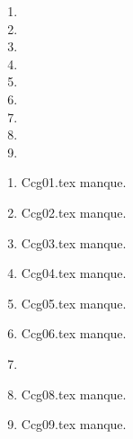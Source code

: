  
 
\begin{enumerate}
  \item  
  \item  
  \item  
  \item  
  \item  
  \item  
  \item  
  \item  
  \item  
\end{enumerate} 
\clearpage 
{}
\begin{enumerate}
  \item Ccg01.tex manque. 
  \item Ccg02.tex manque. 
  \item Ccg03.tex manque. 
  \item Ccg04.tex manque. 
  \item Ccg05.tex manque. 
  \item Ccg06.tex manque. 
  \item  
  \item Ccg08.tex manque. 
  \item Ccg09.tex manque. 
\end{enumerate} 

